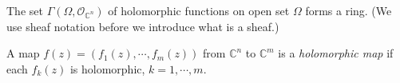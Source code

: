 \begin{cor}
    The set $\Gamma(\Omega,\mathcal{O}_{\mathbb{C}^n})$ of holomorphic functions on open set $\Omega$ forms a ring. (We use sheaf notation before we introduce what is a sheaf.)
\end{cor}

\begin{defn}
    A map $f(z)=(f_1(z),\cdots,f_m(z))$ from $\mathbb{C}^n$ to $\mathbb{C}^m$ is a \emph{holomorphic map} if each $f_k(z)$ is holomorphic, $k=1,\cdots,m$.
\end{defn}